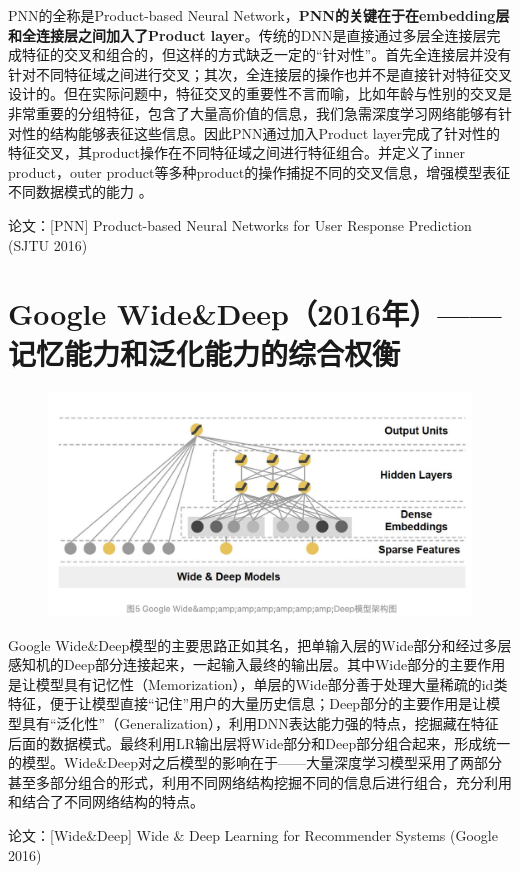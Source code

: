 \documentclass[12pt]{article}
\begin{document}
PNN的全称是Product-based Neural Network，\textbf{PNN的关键在于在embedding层和全连接层之间加入了Product layer}。传统的DNN是直接通过多层全连接层完成特征的交叉和组合的，但这样的方式缺乏一定的“针对性”。首先全连接层并没有针对不同特征域之间进行交叉；其次，全连接层的操作也并不是直接针对特征交叉设计的。但在实际问题中，特征交叉的重要性不言而喻，比如年龄与性别的交叉是非常重要的分组特征，包含了大量高价值的信息，我们急需深度学习网络能够有针对性的结构能够表征这些信息。因此PNN通过加入Product layer完成了针对性的特征交叉，其product操作在不同特征域之间进行特征组合。并定义了inner product，outer product等多种product的操作捕捉不同的交叉信息，增强模型表征不同数据模式的能力 。

论文：[PNN] Product-based Neural Networks for User Response Prediction (SJTU 2016)

\section{Google Wide\&Deep（2016年）——记忆能力和泛化能力的综合权衡}
\begin{figure}[H]
    \centering
    \includegraphics[width=.8\textwidth]{fig/Wide_Deep_Structure.png}
\end{figure}

Google Wide\&Deep模型的主要思路正如其名，把单输入层的Wide部分和经过多层感知机的Deep部分连接起来，一起输入最终的输出层。其中Wide部分的主要作用是让模型具有记忆性（Memorization），单层的Wide部分善于处理大量稀疏的id类特征，便于让模型直接“记住”用户的大量历史信息；Deep部分的主要作用是让模型具有“泛化性”（Generalization），利用DNN表达能力强的特点，挖掘藏在特征后面的数据模式。最终利用LR输出层将Wide部分和Deep部分组合起来，形成统一的模型。Wide\&Deep对之后模型的影响在于——大量深度学习模型采用了两部分甚至多部分组合的形式，利用不同网络结构挖掘不同的信息后进行组合，充分利用和结合了不同网络结构的特点。

论文：[Wide\&Deep] Wide \& Deep Learning for Recommender Systems (Google 2016)
\end{document}
